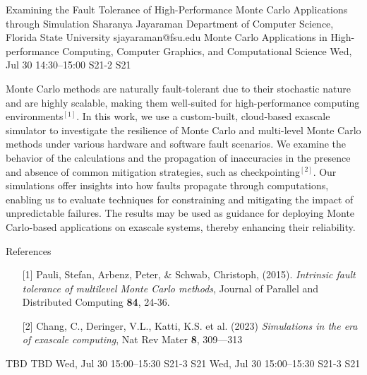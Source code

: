 \begin{talk}
  {Examining the Fault Tolerance of High-Performance Monte Carlo Applications through Simulation}%
  {Sharanya Jayaraman}%
  {Department of Computer Science, Florida State University}%
  {sjayaraman@fsu.edu}%
  {Monte Carlo Applications in High-performance Computing, Computer Graphics, and Computational Science}%
  {}%
  {Wed, Jul 30 14:30–15:00}%
  {S21-2}%
  {S21}%
			
Monte Carlo methods are naturally fault-tolerant due to their stochastic nature and are highly scalable, making them well-suited for high-performance computing environments$^{[1]}$. In this work, we use a custom-built, cloud-based exascale simulator to investigate the resilience of Monte Carlo and multi-level Monte Carlo methods under various hardware and software fault scenarios. We examine the behavior of the calculations and the propagation of inaccuracies in the presence and absence of common mitigation strategies, such as checkpointing$^{[2]}$. Our simulations offer insights into how faults propagate through computations, enabling us to evaluate techniques for constraining and mitigating the impact of unpredictable failures. The results may be used as guidance for deploying Monte Carlo-based applications on exascale systems, thereby enhancing their reliability.

\medskip

References
\begin{enumerate}
	\item[{[1]}] Pauli, Stefan, Arbenz, Peter, \&  Schwab, Christoph, (2015). {\it Intrinsic fault tolerance of multilevel Monte Carlo methods}, Journal of Parallel and Distributed Computing \textbf{84}, 24-36.
	\item[{[2]}] Chang, C., Deringer, V.L., Katti, K.S. et al. (2023) {\it Simulations in the era of exascale computing}, Nat Rev Mater \textbf{8}, 309---313 
\end{enumerate}

\end{talk}

\begin{talk}
  {TBD}%
  {TBD}%
  {Wed, Jul 30 15:00–15:30}%
  {S21-3}%
  {S21}%
  {}%
  {Wed, Jul 30 15:00–15:30}%
  {S21-3}%
  {S21}%
\end{talk}

